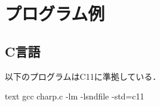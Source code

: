 \documentclass[../../main]{subfiles}
\begin{document}
\chapter{プログラム例}

\section{C言語}

以下のプログラムはC11に準拠している．


\begin{codeblock}{text}
gcc charp.c -lm -lsndfile -std=c11
\end{codeblock}
\end{document}
